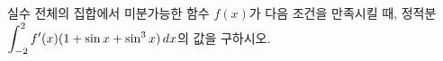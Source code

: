실수 전체의 집합에서 미분가능한 함수 $f(x)$가 다음 조건을 만족시킬 때, 정적분 $\displaystyle\int_{-2}^{2}f'(x)(1+\sin x+\sin^3 x)\mkern3mu dx$의 값을 구하시오. 
